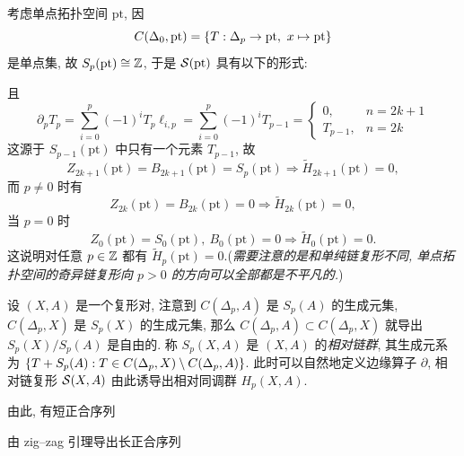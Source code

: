\begin{Example}\label{ex:单点零调}
	考虑单点拓扑空间 $ \mathrm{pt} $, 因
	\[
		C(\Delta_0,\mathrm{pt})=\left\{ T : \Delta_p\to\mathrm{pt},\ x\mapsto \mathrm{pt} \right\}
	\]
	是单点集, 故 $ S_p(\mathrm{pt})\cong\mathbb{Z} $, 于是 $ \mathcal{S}(\mathrm{pt}) $ 具有以下的形式:
	\begin{center}
	\end{center}
	且
	\[
		\partial_pT_p=\sum_{i=0}^p(-1)^iT_p\ell_{i,p}=\sum_{i=0}^p(-1)^iT_{p-1}=\begin{cases}
			0, &n=2k+1\\ T_{p-1}, &n=2k
		\end{cases}
	\]
	这源于 $ S_{p-1}(\mathrm{pt}) $ 中只有一个元素 $ T_{p-1} $, 故
	\[
		Z_{2k+1}(\mathrm{pt})=B_{2k+1}(\mathrm{pt})=S_p(\mathrm{pt})\Longrightarrow \tilde{H}_{2k+1}(\mathrm{pt})=0,
	\]
	而 $ p\ne 0 $ 时有
	\[
		Z_{2k}(\mathrm{pt})=B_{2k}(\mathrm{pt})=0\Longrightarrow\tilde{H}_{2k}(\mathrm{pt})=0,
	\]
	当 $ p=0 $ 时
	\[
		Z_0(\mathrm{pt})=S_0(\mathrm{pt}),\ B_0(\mathrm{pt})=0\Longrightarrow \tilde{H}_0(\mathrm{pt})=0.
	\]
	这说明对任意 $ p\in\mathbb{Z} $ 都有 $ \tilde{H}_p(\mathrm{pt})=0 $.(\textit{需要注意的是和单纯链复形不同, 单点拓扑空间的奇异链复形向 $ p>0 $ 的方向可以全部都是不平凡的.})
\end{Example}

设 $ (X,A) $ 是一个复形对, 注意到 $ C(\Delta_p,A) $ 是 $ S_p(A) $ 的生成元集, $ C(\Delta_p,X) $ 是 $ S_p(X) $ 的生成元集, 那么 $ C(\Delta_p,A)\subset C(\Delta_p,X) $ 就导出 $ S_p(X)/S_p(A) $ 是自由的. 称 $ S_p(X,A) $ 是 $ (X,A) $ 的\emph{相对链群}, 其生成元系为 $ \left\{ T+S_p(A) : T\in C(\Delta_p,X)\setminus C(\Delta_p,A) \right\} $. 此时可以自然地定义边缘算子 $ \partial $, 相对链复形 $ \mathcal{S}(X,A) $ 由此诱导出相对同调群 $ H_p(X,A) $.

由此, 有短正合序列
\begin{center}
\end{center}
由 zig--zag 引理导出长正合序列
\begin{center}
\end{center}

